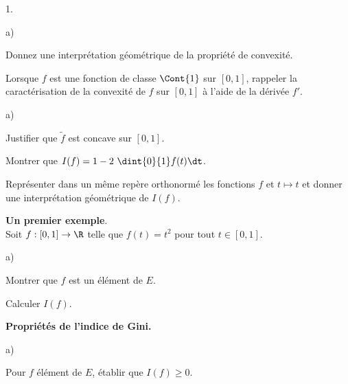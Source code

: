 \documentclass[11pt]{article}%
\begin{document}
\begin{noliste}{1.}
 \setlength{\itemsep}{4mm}
 \item 
 \begin{noliste}{a)}
  \setlength{\itemsep}{2mm}
  \item Donnez une interprétation géométrique de la propriété de 
  convexité.
  
  
  
  
  

  
  \item Lorsque $f$ est une fonction de classe $\Cont{1}$ sur $[0,1]$, 
  rappeler la caractérisation de la convexité de $f$ sur $[0,1]$ à 
  l'aide de la dérivée $f'$.
  
  

 \end{noliste}
 
 \item 
 \begin{noliste}{a)}
  \setlength{\itemsep}{2mm}
  \item Justifier que $\tilde{f}$ est concave sur $[0,1]$.
  
  
  
  \item Montrer que $I(f)= 1-2 \ \dint{0}{1}f(t) \dt$. 
  
  

  
  \item Représenter dans un même repère orthonormé les fonctions $f$ et 
  $t \mapsto t $ et donner une interprétation géométrique de $I(f)$.
  
  
 \end{noliste}
 
 
 
 
 
 
 \item \textbf{Un premier exemple}.\\
 Soit $f : [0,1] \to \R$ telle que $f(t)= t^2$ pour tout $t \in [0,1]$. 
 \begin{noliste}{a)}
  \setlength{\itemsep}{2mm}
  \item Montrer que $f$ est un élément de $E$.
  
  

  
  \item Calculer $I(f)$. 
  
  
 \end{noliste}
 
 \item \textbf{Propriétés de l'indice de Gini.}
 \begin{noliste}{a)}
  \item Pour $f$ élément de $E$, établir que $I(f) \geq 0$. 
  

\end{noliste}
\end{noliste}
\end{document}
